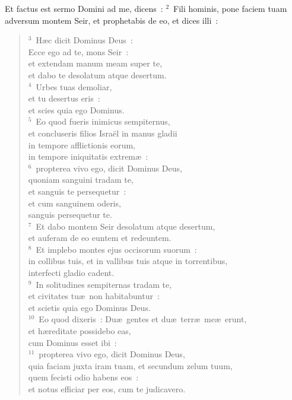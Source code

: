 \lettrine[lines=10,image=true,loversize=0.05,lraise=-0.03]{E}{}t factus est sermo Domini ad me, dicens~:
${}^{2}$~Fili hominis, pone faciem tuam adversum montem Seir, et prophetabis de eo, et dices illi~:
\begin{flushleft}\begin{verse}${}^{3}$~H\ae c dicit Dominus Deus~:\\ Ecce ego ad te, mons Seir~:\\ et extendam manum meam super te,\\ et dabo te desolatum atque desertum.\\
${}^{4}$~Urbes tuas demoliar,\\ et tu desertus eris~:\\ et scies quia ego Dominus.\\
${}^{5}$~Eo quod fueris inimicus sempiternus,\\ et concluseris filios Isra\"el in manus gladii\\ in tempore afflictionis eorum,\\ in tempore iniquitatis extrem\ae~:\\
${}^{6}$~propterea vivo ego, dicit Dominus Deus,\\ quoniam sanguini tradam te,\\ et sanguis te persequetur~:\\ et cum sanguinem oderis,\\ sanguis persequetur te.\\
${}^{7}$~Et dabo montem Seir desolatum atque desertum,\\ et auferam de eo euntem et redeuntem.\\
${}^{8}$~Et implebo montes ejus occisorum suorum~:\\ in collibus tuis, et in vallibus tuis atque in torrentibus,\\ interfecti gladio cadent.\\
${}^{9}$~In solitudines sempiternas tradam te,\\ et civitates tu\ae\ non habitabuntur~:\\ et scietis quia ego Dominus Deus.\\
${}^{10}$~Eo quod dixeris~: Du\ae\ gentes et du\ae\ terr\ae\ me\ae\ erunt,\\ et h\ae reditate possidebo eas,\\ cum Dominus esset ibi~:\\
${}^{11}$~propterea vivo ego, dicit Dominus Deus,\\ quia faciam juxta iram tuam, et secundum zelum tuum,\\ quem fecisti odio habens eos~:\\ et notus efficiar per eos, cum te judicavero.\\

\end{verse}
\end{flushleft}
